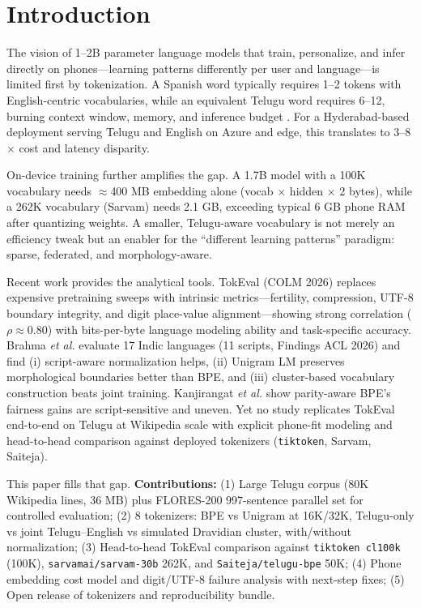 \documentclass[conference]{IEEEtran}
\begin{document}
\section{Introduction}
The vision of 1--2B parameter language models that train, personalize, and infer directly on phones---learning patterns differently per user and language---is limited first by tokenization. A Spanish word typically requires 1--2 tokens with English-centric vocabularies, while an equivalent Telugu word requires 6--12, burning context window, memory, and inference budget \cite{meister2026tokeval, brahma2026indic, anylearn2026tokenization}. For a Hyderabad-based deployment serving Telugu and English on Azure and edge, this translates to 3--8$\times$ cost and latency disparity.

On-device training further amplifies the gap. A 1.7B model with a 100K vocabulary needs $\approx$400 MB embedding alone (vocab $\times$ hidden $\times$ 2 bytes), while a 262K vocabulary (Sarvam) needs 2.1 GB, exceeding typical 6 GB phone RAM after quantizing weights. A smaller, Telugu-aware vocabulary is not merely an efficiency tweak but an enabler for the ``different learning patterns'' paradigm: sparse, federated, and morphology-aware.

Recent work provides the analytical tools. TokEval \cite{meister2026tokeval} (COLM 2026) replaces expensive pretraining sweeps with intrinsic metrics---fertility, compression, UTF-8 boundary integrity, and digit place-value alignment---showing strong correlation ($\rho\approx0.80$) with bits-per-byte language modeling ability and task-specific accuracy. Brahma \textit{et al.} \cite{brahma2026indic} evaluate 17 Indic languages (11 scripts, Findings ACL 2026) and find (i) script-aware normalization helps, (ii) Unigram LM preserves morphological boundaries better than BPE, and (iii) cluster-based vocabulary construction beats joint training. Kanjirangat \textit{et al.} \cite{kanjirangat2026parity} show parity-aware BPE's fairness gains are script-sensitive and uneven. Yet no study replicates TokEval end-to-end on Telugu at Wikipedia scale with explicit phone-fit modeling and head-to-head comparison against deployed tokenizers (\texttt{tiktoken}, Sarvam, Saiteja).

This paper fills that gap. \textbf{Contributions:} (1) Large Telugu corpus (80K Wikipedia lines, 36 MB) plus FLORES-200 997-sentence parallel set for controlled evaluation; (2) 8 tokenizers: BPE vs Unigram at 16K/32K, Telugu-only vs joint Telugu--English vs simulated Dravidian cluster, with/without normalization; (3) Head-to-head TokEval comparison against \texttt{tiktoken cl100k} (100K), \texttt{sarvamai/sarvam-30b} 262K, and \texttt{Saiteja/telugu-bpe} 50K; (4) Phone embedding cost model and digit/UTF-8 failure analysis with next-step fixes; (5) Open release of tokenizers and reproducibility bundle.
\end{document}
